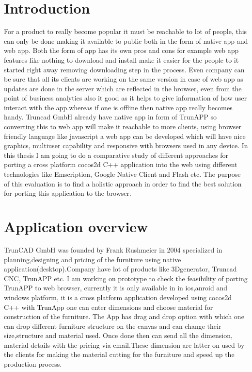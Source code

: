 \documentclass[23pt]{article}
\begin{document}
\newpage


\setcounter{secnumdepth}{3}


\section{Introduction }

{\Large For a product to really become popular it must be reachable to lot of people, this can only be done making it available to public both in the form of native app and web app. Both the form of app has its own pros and cons for example web app features like nothing to download and install make it easier for the people to it started right away removing downloading step in the process. Even company can be sure that all its clients are working on the same version in case of web app as updates are done in the server which are reflected in the browser, even from the point of business analytics also it good as it helps to give information of how user interact with the app.whereas if one is offline then native app really becomes handy. Truncad GmbH already have native app in form of TrunAPP so converting this to web app will make it reachable to more clients, using browser friendly language like javascript a web app can be developed which will have nice graphics, multiuser capability and  responsive with browsers used in any device. In this thesis I am going to do a comparative study of different approaches for porting a cross platform cocos2d C++ application into the web  using different technologies like Emscription, Google Native Client and Flash etc. The purpose of this evaluation is to find a holistic approach in order to find the best solution for porting this application to the browser.
 \par}

\newpage

\section{Application overview}

{\Large TrunCAD GmbH was founded by Frank Rushmeier in 2004 specialized in planning,designing and pricing of the furniture using native application(desktop).Company have lot of products like 3Dgenerator, Truncad CNC, TrunAPP etc. I  am working on prototype to check the feasibility of porting TrunAPP to web browser, currently it is only available in in ios,anroid and windows platform, it is a cross platform application developed using cocos2d C++  with TrunApp one can enter dimensions and choose material for construction of the furniture. The App  has drag and drop option with which one can drop different furniture structure on the canvas and can change their size,structure and material used. Once done then can send all the dimension, material details with the pricing via email.These dimension are latter on used by the clients for making the material cutting for the furniture and speed up the production process.\cite{truncad} \par}
\end{document}
